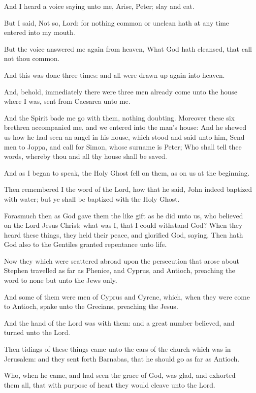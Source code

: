 \Verse And I heard a voice saying unto me, Arise, Peter; slay and eat.

\Verse But I said, Not so, Lord: for nothing common or unclean hath at any time entered into my mouth.

\Verse But the voice answered me again from heaven, What God hath cleansed, that call not thou common.

\Verse And this was done three times: and all were drawn up again into heaven.

\Verse And, behold, immediately there were three men already come unto the house where I was, sent from Caesarea unto me.

\Verse And the Spirit bade me go with them, nothing doubting. Moreover these six brethren accompanied me, and we entered into the man's house: \Verse And he shewed us how he had seen an angel in his house, which stood and said unto him, Send men to Joppa, and call for Simon, whose surname is Peter; \Verse Who shall tell thee words, whereby thou and all thy house shall be saved.

\Verse And as I began to speak, the Holy Ghost fell on them, as on us at the beginning.

\Verse Then remembered I the word of the Lord, how that he said, John indeed baptized with water; but ye shall be baptized with the Holy Ghost.

\Verse Forasmuch then as God gave them the like gift as he did unto us, who believed on the Lord Jesus Christ; what was I, that I could withstand God?  \Verse When they heard these things, they held their peace, and glorified God, saying, Then hath God also to the Gentiles granted repentance unto life.

\Verse Now they which were scattered abroad upon the persecution that arose about Stephen travelled as far as Phenice, and Cyprus, and Antioch, preaching the word to none but unto the Jews only.

\Verse And some of them were men of Cyprus and Cyrene, which, when they were come to Antioch, spake unto the Grecians, preaching the \LORD Jesus.

\Verse And the hand of the Lord was with them: and a great number believed, and turned unto the Lord.

\Verse Then tidings of these things came unto the ears of the church which was in Jerusalem: and they sent forth Barnabas, that he should go as far as Antioch.

\Verse Who, when he came, and had seen the grace of God, was glad, and exhorted them all, that with purpose of heart they would cleave unto the Lord.

